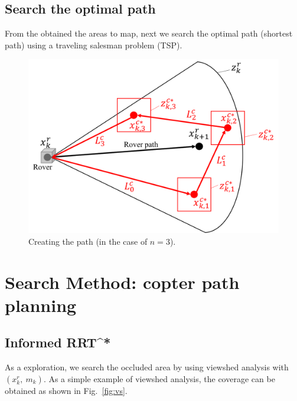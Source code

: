 \documentclass[conference]{IEEEtran}
\begin{document}
\subsection{Search the optimal path}
From the obtained the areas to map, next we search the optimal path (shortest path) using a traveling salesman problem (TSP).
\begin{figure}[h]
		\centering
		\includegraphics[width=1.0\columnwidth]{figs/8_10.png}
		\caption{Creating the path (in the case of $n=3$).}
		\label{fig:8_10}
\end{figure}

\section{Search Method: copter path planning}
\subsection{Informed RRT^*}





As a exploration, we search the occluded area by using viewshed analysis with $(x^r_k,~m_k)$. As a simple example of viewshed analysis, the coverage can be obtained as shown in Fig.~\ref{fig:vs}.
\end{document}
